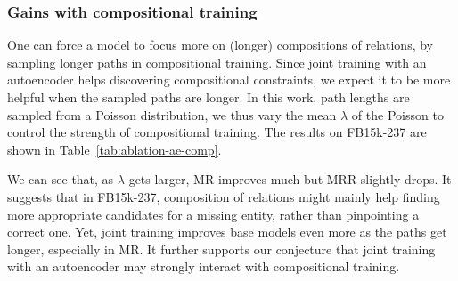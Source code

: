 \documentclass[11pt,a4paper]{article}
\begin{document}

\subsubsection*{Gains with compositional training}\label{sec:gainscomptrain}

One can force a model to focus more on (longer) compositions of relations, 
by sampling longer paths in compositional training. 
Since joint training with an autoencoder helps discovering compositional 
constraints, we expect it to be more helpful when the sampled paths are longer. 
In this work, path lengths are sampled from a Poisson distribution, we thus 
vary the mean $\lambda$ of the Poisson to control the strength of compositional 
training. The results on FB15k-237 are shown in Table~\ref{tab:ablation-ae-comp}. 

We can see that, as $\lambda$ gets larger, MR improves much but MRR slightly drops. 
It suggests that in FB15k-237, composition of relations might mainly help 
finding more appropriate candidates for a missing entity, rather than 
pinpointing a correct one. Yet, joint training improves base models even more 
as the paths get longer, especially in MR. 
It further supports our conjecture that joint training with an autoencoder 
may strongly interact with compositional training. 
\end{document}
